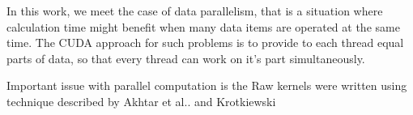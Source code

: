 In this work, we meet the case of data parallelism\cite{cheng2014professional}, that is a situation where calculation time might benefit when many data items are operated at the same time. The CUDA approach for such problems is to provide to each thread equal parts of data, so that every thread can work on it's part simultaneously.

Important issue with parallel computation is the 
Raw kernels were written using technique described by Akhtar et al.\cite{akhtar2018efficient}. and Krotkiewski \cite{krotkiewski2013efficient}



\cite{learn_cuda}
\cite{cheng2014professional}




